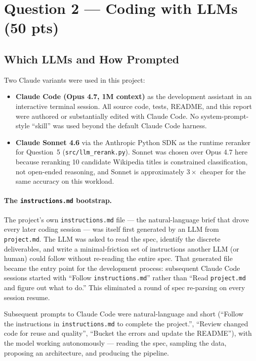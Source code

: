 \documentclass[11pt]{article}
\begin{document}
\section{Question 2 --- Coding with LLMs (50 pts)}

\subsection{Which LLMs and How Prompted}

Two Claude variants were used in this project:

\begin{itemize}
  \item \textbf{Claude Code (Opus 4.7, 1M context)} as the development
        assistant in an interactive terminal session. All source code,
        tests, README, and this report were authored or substantially
        edited with Claude Code. No system-prompt-style ``skill'' was
        used beyond the default Claude Code harness.
  \item \textbf{Claude Sonnet 4.6} via the Anthropic Python SDK as the
        runtime reranker for Question~5 (\texttt{src/llm\_rerank.py}).
        Sonnet was chosen over Opus 4.7 here because reranking 10
        candidate Wikipedia titles is constrained classification, not
        open-ended reasoning, and Sonnet is approximately $3\times$
        cheaper for the same accuracy on this workload.
\end{itemize}

\paragraph{The \texttt{instructions.md} bootstrap.} The project's own
\texttt{instructions.md} file --- the natural-language brief that drove
every later coding session --- was itself first generated by an LLM
from \texttt{project.md}. The LLM was asked to read the spec, identify
the discrete deliverables, and write a minimal-friction set of
instructions another LLM (or human) could follow without re-reading
the entire spec. That generated file became the entry point for the
development process: subsequent Claude Code sessions started with
``Follow \texttt{instructions.md}'' rather than ``Read
\texttt{project.md} and figure out what to do.'' This eliminated a
round of spec re-parsing on every session resume.

Subsequent prompts to Claude Code were natural-language and short
(``Follow the instructions in \texttt{instructions.md} to complete
the project.'', ``Review changed code for reuse and quality'',
``Bucket the errors and update the README''), with the model working
autonomously --- reading the spec, sampling the data, proposing an
architecture, and producing the pipeline.
\end{document}
